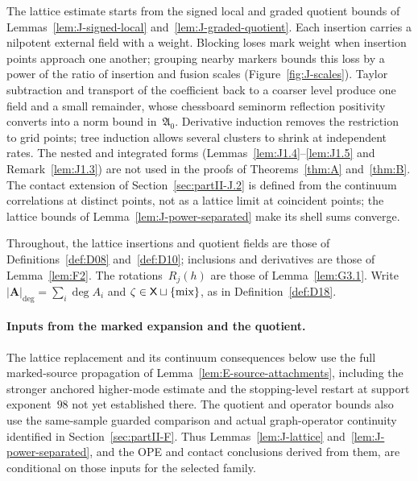The lattice estimate starts from the signed local and graded quotient bounds of Lemmas~\ref{lem:J-signed-local} and~\ref{lem:J-graded-quotient}. Each insertion carries a nilpotent external field with a weight. Blocking loses mark weight when insertion points approach one another; grouping nearby markers bounds this loss by a power of the ratio of insertion and fusion scales (Figure~\ref{fig:J-scales}). Taylor subtraction and transport of the coefficient back to a coarser level produce one field and a small remainder, whose chessboard seminorm reflection positivity converts into a norm bound in~$\mathfrak A_0$. Derivative induction removes the restriction to grid points; tree induction allows several clusters to shrink at independent rates. The nested and integrated forms (Lemmas~\ref{lem:J1.4}--\ref{lem:J1.5} and Remark~\ref{lem:J1.3}) are not used in the proofs of Theorems~\ref{thm:A} and~\ref{thm:B}. The contact extension of Section~\ref{sec:partII-J.2} is defined from the continuum correlations at distinct points, not as a lattice limit at coincident points; the lattice bounds of Lemma~\ref{lem:J-power-separated} make its shell sums converge.

Throughout, the lattice insertions and quotient fields are those of Definitions~\ref{def:D08} and~\ref{def:D10}; inclusions and derivatives are those of Lemma~\ref{lem:F2}. The rotations~$R_j(h)$ are those of Lemma~\ref{lem:G3.1}. Write $|\boldsymbol A|_{\deg}=\sum_i\deg A_i$ and $\zeta\in\mathsf{X}\sqcup\{\mathrm{mix}\}$, as in Definition~\ref{def:D18}.

\paragraph{Inputs from the marked expansion and the quotient.}

The lattice replacement and its continuum consequences below use the full marked-source propagation of Lemma~\ref{lem:E-source-attachments}, including the stronger anchored higher-mode estimate and the stopping-level restart at support exponent~$98$ not yet established there. The quotient and operator bounds also use the same-sample guarded comparison and actual graph-operator continuity identified in Section~\ref{sec:partII-F}. Thus Lemmas~\ref{lem:J-lattice} and~\ref{lem:J-power-separated}, and the OPE and contact conclusions derived from them, are conditional on those inputs for the selected family.

